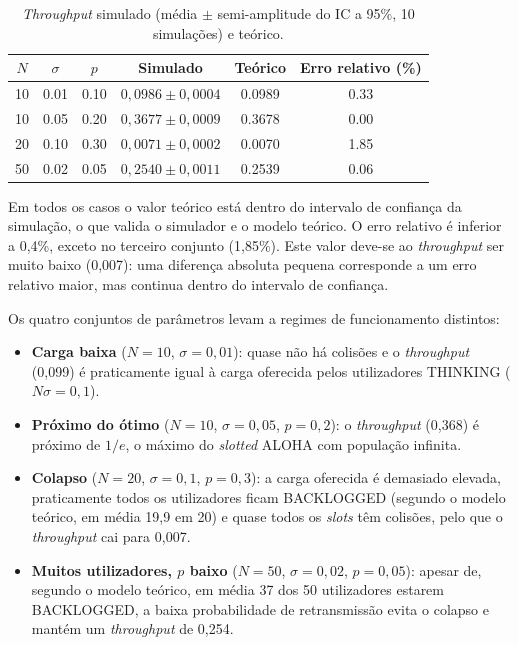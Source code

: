 \documentclass[10pt,a4paper]{article}
\begin{document}
\begin{table}[H]
\centering
\begin{tabular}{S[table-format=2.0]S[table-format=1.2]S[table-format=1.2]cS[table-format=1.4]S[table-format=1.2]}
\toprule
{$N$} & {$\sigma$} & {$p$} & {Simulado} & {Teórico} & {Erro relativo (\%)}\\
 & 0.01 & 0.10 & $0{,}0986\pm0{,}0004$ & 0.0989 & 0.33\\
10 & 0.05 & 0.20 & $0{,}3677\pm0{,}0009$ & 0.3678 & 0.00\\
20 & 0.10 & 0.30 & $0{,}0071\pm0{,}0002$ & 0.0070 & 1.85\\
50 & 0.02 & 0.05 & $0{,}2540\pm0{,}0011$ & 0.2539 & 0.06\\
\bottomrule
\end{tabular}
\caption{\textit{Throughput} simulado (média $\pm$ semi-amplitude do IC a 95\%, 10 simulações) e teórico.}
\label{tab:ex03b}
\end{table}

Em todos os casos o valor teórico está dentro do intervalo de confiança da simulação, o que valida o simulador e o modelo teórico. O erro relativo é inferior a 0,4\%, exceto no terceiro conjunto (1,85\%). Este valor deve-se ao \textit{throughput} ser muito baixo (0,007): uma diferença absoluta pequena corresponde a um erro relativo maior, mas continua dentro do intervalo de confiança.

\newpage

Os quatro conjuntos de parâmetros levam a regimes de funcionamento distintos:
\begin{itemize}
  \item \textbf{Carga baixa} ($N=10$, $\sigma=0{,}01$): quase não há colisões e o \textit{throughput} (0,099) é praticamente igual à carga oferecida pelos utilizadores THINKING ($N\sigma=0{,}1$).
  \item \textbf{Próximo do ótimo} ($N=10$, $\sigma=0{,}05$, $p=0{,}2$): o \textit{throughput} (0,368) é próximo de $1/e$, o máximo do \textit{slotted} ALOHA com população infinita.
  \item \textbf{Colapso} ($N=20$, $\sigma=0{,}1$, $p=0{,}3$): a carga oferecida é demasiado elevada, praticamente todos os utilizadores ficam BACKLOGGED (segundo o modelo teórico, em média 19,9 em 20) e quase todos os \textit{slots} têm colisões, pelo que o \textit{throughput} cai para 0,007.
  \item \textbf{Muitos utilizadores, $p$ baixo} ($N=50$, $\sigma=0{,}02$, $p=0{,}05$): apesar de, segundo o modelo teórico, em média 37 dos 50 utilizadores estarem BACKLOGGED, a baixa probabilidade de retransmissão evita o colapso e mantém um \textit{throughput} de 0,254.
\end{itemize}
\end{document}
